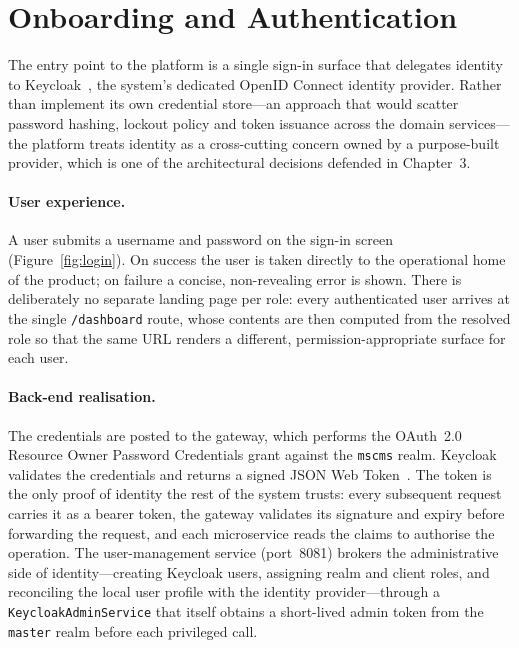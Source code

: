 \section{Onboarding and Authentication}
\label{sec:res-login}

The entry point to the platform is a single sign-in surface that delegates identity
to Keycloak~\cite{keycloak}, the system's dedicated OpenID Connect identity provider.
Rather than implement its own credential store---an approach that would scatter
password hashing, lockout policy and token issuance across the domain services---the
platform treats identity as a cross-cutting concern owned by a purpose-built provider,
which is one of the architectural decisions defended in Chapter~3.

\paragraph{User experience.} A user submits a username and password on the sign-in
screen (Figure~\ref{fig:login}). On success the user is taken directly to the
operational home of the product; on failure a concise, non-revealing error is shown.
There is deliberately no separate landing page per role: every authenticated user
arrives at the single \texttt{/dashboard} route, whose contents are then computed from
the resolved role so that the same URL renders a different, permission-appropriate
surface for each user.

\paragraph{Back-end realisation.} The credentials are posted to the gateway, which
performs the OAuth~2.0 Resource Owner Password Credentials grant against the
\texttt{mscms} realm. Keycloak validates the credentials and returns a signed JSON Web
Token~\cite{jwt}. The token is the only proof of identity the rest of the system
trusts: every subsequent request carries it as a bearer token, the gateway validates
its signature and expiry before forwarding the request, and each microservice reads the
claims to authorise the operation. The user-management service (port~8081) brokers the
administrative side of identity---creating Keycloak users, assigning realm and client
roles, and reconciling the local user profile with the identity provider---through a
\texttt{KeycloakAdminService} that itself obtains a short-lived admin token from the
\texttt{master} realm before each privileged call.

